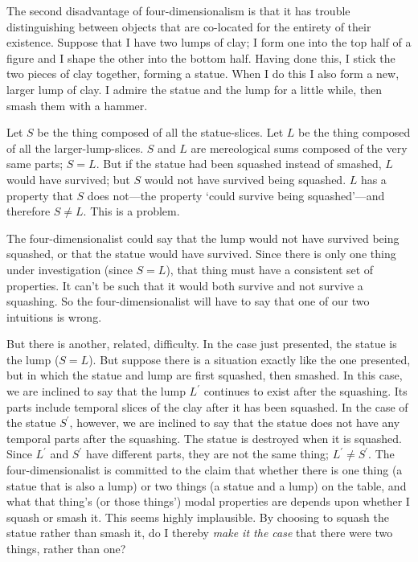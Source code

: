 \documentclass[11pt]{article}
\begin{document}
\begin{spacing}{1.5}
The second disadvantage of four-dimensionalism is that it has trouble
distinguishing between objects that are co-located for the entirety of
their existence.  Suppose that I have two lumps of clay; I form one
into the top half of a figure and I shape the other into the bottom
half.  Having done this, I stick the two pieces of clay together,
forming a statue.  When I do this I also form a new, larger lump of
clay.  I admire the statue and the lump for a little while, then smash
them with a hammer.

Let $S$ be the thing composed of all the statue-slices.  Let $L$ be
the thing composed of all the larger-lump-slices.  $S$ and $L$ are
mereological sums composed of the very same parts; $S = L$.  But if
the statue had been squashed instead of smashed, $L$ would have
survived; but $S$ would not have survived being squashed.  $L$ has a
property that $S$ does not---the property `could survive being
squashed'---and therefore $S \neq L$.  This is a problem.

The four-dimensionalist could say that the lump would not have
survived being squashed, or that the statue would have survived.
Since there is only one thing under investigation (since $S = L$),
that thing must have a consistent set of properties.  It can't be such
that it would both survive and not survive a squashing.  So the
four-dimensionalist will have to say that one of our two intuitions is
wrong.

But there is another, related, difficulty.  In the case just
presented, the statue is the lump ($S = L$).  But suppose there is a
situation exactly like the one presented, but in which the statue and
lump are first squashed, then smashed.  In this case, we are inclined
to say that the lump $L^{\prime}$ continues to exist after the
squashing.  Its parts include temporal slices of the clay after it has
been squashed.  In the case of the statue $S^{\prime}$, however, we
are inclined to say that the statue does not have any temporal parts
after the squashing.  The statue is destroyed when it is squashed.
Since $L^{\prime}$ and $S^{\prime}$ have different parts, they are not
the same thing; $L^{\prime} \neq S^{\prime}$.  The four-dimensionalist
is committed to the claim that whether there is one thing (a statue
that is also a lump) or two things (a statue and a lump) on the table,
and what that thing's (or those things') modal properties are depends
upon whether I squash or smash it.  This seems highly implausible.  By
choosing to squash the statue rather than smash it, do I thereby {\em
  make it the case} that there were two things, rather than one?


\end{spacing}
\end{document}

